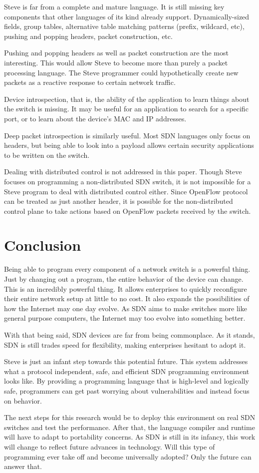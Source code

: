 Steve is far from a complete and mature language. It is still missing key components that other languages of its kind already support. Dynamically-sized fields, group tables, alternative table matching patterns (prefix, wildcard, etc), pushing and popping headers, packet construction, etc.

Pushing and popping headers as well as packet construction are the most interesting. This would allow Steve to become more than purely a packet processing language. The Steve programmer could hypothetically create new packets as a reactive response to certain network traffic.

Device introspection, that is, the ability of the application to learn things about the switch is missing.
It may be useful for an application to search for a specific port, or to learn about the device's MAC and IP addresses.

Deep packet introspection is similarly useful. Most SDN languages only focus on headers, but being able to look into a payload allows certain security applications to be written on the switch.

Dealing with distributed control is not addressed in this paper. Though Steve focuses on programming a non-distributed SDN switch, it is not impossible for a Steve program to deal with distributed control either. Since OpenFlow protocol can be treated as just another header,
it is possible for the non-distributed control plane to take actions based on OpenFlow packets received by the switch. 

\section{Conclusion}

Being able to program every component of a network switch is a powerful thing. Just by changing out a program, the entire behavior of the device can change. This is an incredibly powerful thing. It allows enterprises to quickly reconfigure their entire network setup at little to no cost. It also expands the possibilities of how the Internet may one day evolve. As SDN aims to make switches more like general purpose computers, the Internet may too evolve into something better.

With that being said, SDN devices are far from being commonplace. As it stands, SDN is still trades speed for flexibility, making enterprises hesitant to adopt it. 

Steve is just an infant step towards this potential future. This system addresses what a protocol independent, safe, and efficient SDN programming environment looks like. By providing a programming language that is high-level and logically safe, programmers
can get past worrying about vulnerabilities and instead focus on behavior.

The next steps for this research would be to deploy this environment on real SDN switches and test the performance. After that, the language compiler and runtime will have to adapt to portability concerns. As SDN is still in its infancy, this work will change to reflect future advances in technology. Will this type of programming ever take off and become universally adopted? Only the future can answer that.
